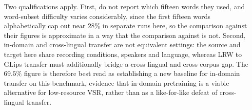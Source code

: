 \documentclass[10pt, a4paper]{article}
\begin{document}
\noindent Two qualifications apply. First, \citet{schwiebert2022glips} do not report which fifteen words they used, and word-subset difficulty varies considerably, since the first fifteen words alphabetically cap out near $28\%$ in separate runs here, so the comparison against their figures is approximate in a way that the comparison against \citet{ameer2024} is not. Second, in-domain and cross-lingual transfer are not equivalent settings: the source and target here share recording conditions, speakers and language, whereas LRW to GLips transfer must additionally bridge a cross-lingual and cross-corpus gap. The $69.5\%$ figure is therefore best read as establishing a new baseline for in-domain transfer on this benchmark, evidence that in-domain pretraining is a viable alternative for low-resource VSR, rather than as a like-for-like defeat of cross-lingual transfer.
\end{document}

